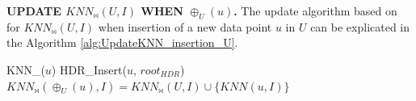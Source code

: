 \noindent\textbf{UPDATE \boldmath$KNN_{\bowtie}(U,I)$ WHEN $\oplus_{U}(u)$.} The update algorithm based on \dualtree for $KNN_{\bowtie}(U,I)$ when insertion of a new data point $u$ in $U$ can be explicated in the Algorithm \ref{alg:UpdateKNN_insertion_U}. 

\begin{algorithm}[t]
\caption{KNN$_{\bowtie}$\_Insertion\_U($u$)}\label{alg:UpdateKNN_insertion_U}

KNN\_\dualtree($u$)\;
HDR\_Insert($u$, $root_{HDR}$)\;
$KNN_{\bowtie}(\oplus_{U}(u),I)=KNN_{\bowtie}(U,I)\cup \{KNN(u,I)\}$\;

\end{algorithm}

